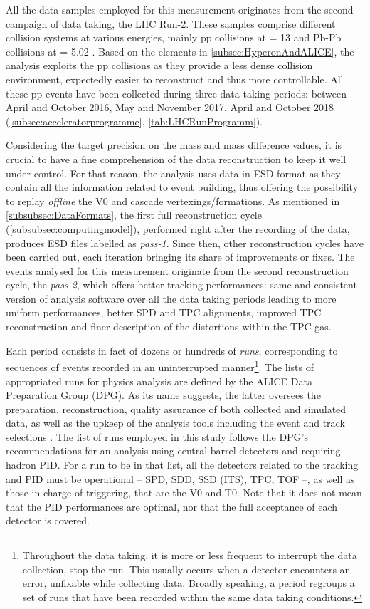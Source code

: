 All the data samples employed for this measurement originates from the second campaign of data taking, the LHC Run-2. These samples comprise different collision systems at various energies, mainly pp collisions at \sqrtS = 13 \tev and Pb-Pb collisions at \sqrtSnn = 5.02 \tev. Based on the elements in \Sec\ref{subsec:HyperonAndALICE}, the analysis exploits the pp collisions as they provide a less dense collision environment, expectedly easier to reconstruct and thus more controllable. All these pp events have been collected during three data taking periods: between April and October 2016, May and November 2017, April and October 2018 (\Sec\ref{subsec:acceleratorprogramme}, \tab\ref{tab:LHCRunProgramm}).

Considering the target precision on the mass and mass difference values, it is crucial to have a fine comprehension of the data reconstruction to keep it well under control. For that reason, the analysis uses data in ESD format as they contain all the information related to event building, thus offering the possibility to replay \textit{offline} the V0 and cascade vertexings/formations. As mentioned in \Sec\ref{subsubsec:DataFormats}, the first full reconstruction cycle (\Sec\ref{subsubsec:computingmodel}), performed right after the recording of the data, produces ESD files labelled as \textit{pass-1}. Since then, other reconstruction cycles have been carried out, each iteration bringing its share of improvements or fixes. The events analysed for this measurement originate from the second reconstruction cycle, the \emph{pass-2}, which offers better tracking performances: same and consistent version of analysis software over all the data taking periods leading to more uniform performances, better SPD and TPC alignments, improved TPC reconstruction and finer description of the distortions within the TPC gas.

Each period consists in fact of dozens or hundreds of \textit{runs}, corresponding to sequences of events recorded in an uninterrupted manner\footnote{Throughout the data taking, it is more or less frequent to interrupt the data collection, \ie stop the run. This usually occurs when a detector encounters an error, unfixable while collecting data. Broadly speaking, a period regroups a set of runs that have been recorded within the same data taking conditions.}. The lists of appropriated runs for physics analysis are defined by the ALICE Data Preparation Group (DPG). As its name suggests, the latter oversees the preparation, reconstruction, quality assurance of both collected and simulated data, as well as the upkeep of the analysis tools including the event and track selections \cite{alicecollaborationALICEDataPreparation2023}. The list of runs employed in this study follows the DPG's recommendations for an analysis using central barrel detectors and requiring hadron PID. For a run to be in that list, all the detectors related to the tracking and PID must be operational -- \ie SPD, SDD, SSD (ITS), TPC, TOF --, as well as those in charge of triggering, that are the V0 and T0. Note that it does not mean that the PID performances are optimal, nor that the full acceptance of each detector is covered.\\

